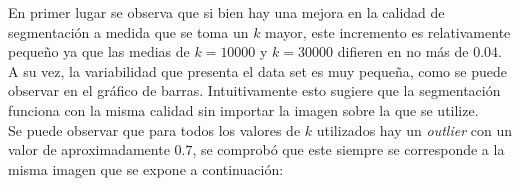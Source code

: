 \indent En primer lugar se observa que si bien hay una mejora en la calidad de segmentaci\'on a medida que se toma un $k$ mayor, este incremento es relativamente peque\~no ya que las medias de $k=10000$ y $k=30000$ difieren en no m\'as de $0.04$. A su vez, la variabilidad que presenta el data set es muy peque\~na, como se puede observar en el gr\'afico de barras. Intuitivamente esto sugiere que la segmentaci\'on funciona con la misma calidad sin importar la imagen sobre la que se utilize.\\
\indent Se puede observar que para todos los valores de $k$ utilizados hay un \textit{outlier} con un valor de aproximadamente $0.7$, se comprob\'o que este siempre se corresponde a la misma imagen que se expone a continuaci\'on:
\begin{figure}[H]
	\begin{center}
	\hspace{3mm}
	\hspace{3mm}
	\caption{}
	\end{center}
	\label{Fscores}
\end{figure}
